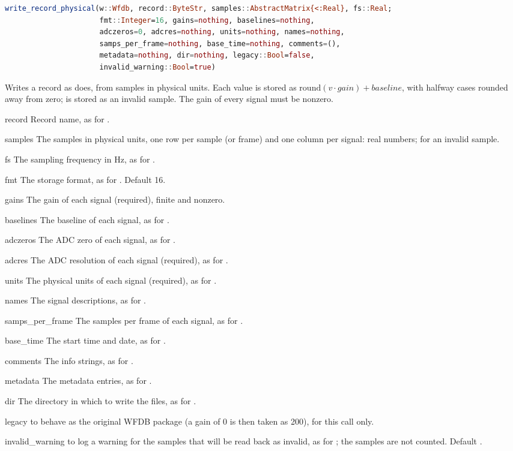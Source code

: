 \begin{lstlisting}[language=Julia,style=signature]
write_record_physical(w::Wfdb, record::ByteStr, samples::AbstractMatrix{<:Real}, fs::Real;
                      fmt::Integer=16, gains=nothing, baselines=nothing,
                      adczeros=0, adcres=nothing, units=nothing, names=nothing,
                      samps_per_frame=nothing, base_time=nothing, comments=(),
                      metadata=nothing, dir=nothing, legacy::Bool=false,
                      invalid_warning::Bool=true)
\end{lstlisting}
Writes a record as  does, from samples in physical units. Each value
 is stored as $\mathrm{round}(v \cdot \mathit{gain}) + \mathit{baseline}$, with
halfway cases rounded away from zero;  is stored as an invalid sample. The gain
of every signal must be nonzero.
\begin{params}
\item[record] Record name, as for .
\item[samples] The samples in physical units, one row per sample (or frame) and one column
  per signal: real numbers;  for an invalid sample.
\item[fs] The sampling frequency in Hz, as for .
\item[fmt] The storage format, as for . Default 16.
\item[gains] The gain of each signal (required), finite and nonzero.
\item[baselines] The baseline of each signal, as for .
\item[adczeros] The ADC zero of each signal, as for .
\item[adcres] The ADC resolution of each signal (required), as for .
\item[units] The physical units of each signal (required), as for .
\item[names] The signal descriptions, as for .
\item[samps\_per\_frame] The samples per frame of each signal, as for
  .
\item[base\_time] The start time and date, as for .
\item[comments] The info strings, as for .
\item[metadata] The metadata entries, as for .
\item[dir] The directory in which to write the files, as for .
\item[legacy]  to behave as the original WFDB package (a gain of 0 is then
  taken as 200), for this call only.
\item[invalid\_warning]  to log a warning for the samples that will be read
  back as invalid, as for ; the  samples are not counted.
  Default .
\end{params}
